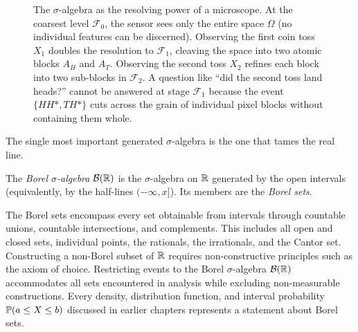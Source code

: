 \begin{figure}[H]
\caption{The $\sigma$-algebra as the resolving power of a microscope. At the coarsest level $\mathcal{F}_0$, the sensor sees only the entire space $\Omega$ (no individual features can be discerned). Observing the first coin toss $X_1$ doubles the resolution to $\mathcal{F}_1$, cleaving the space into two atomic blocks $A_H$ and $A_T$. Observing the second toss $X_2$ refines each block into two sub-blocks in $\mathcal{F}_2$. A question like ``did the second toss land heads?'' cannot be answered at stage $\mathcal{F}_1$ because the event $\{HH*, TH*\}$ cuts across the grain of individual pixel blocks without containing them whole.}
\label{ch36:fig-partition-tree}
\end{figure}

The single most important generated $\sigma$-algebra is the one that tames the
real line.

\begin{definition}
\label{ch36:borel}
The \emph{Borel $\sigma$-algebra} $\mathcal{B}(\R)$ is the $\sigma$-algebra on
$\R$ generated by the open intervals (equivalently, by the half-lines
$(-\infty, x]$). Its members are the \emph{Borel sets}.
\end{definition}

\begin{happeningbox}
The Borel sets encompass every set obtainable from intervals through countable
unions, countable intersections, and complements. This includes all open and closed
sets, individual points, the rationals, the irrationals, and the Cantor set.
Constructing a non-Borel subset of $\R$ requires non-constructive principles such
as the axiom of choice. Restricting events to the Borel $\sigma$-algebra $\mathcal{B}(\R)$
accommodates all sets encountered in analysis while excluding non-measurable constructions.
Every density, distribution function, and interval probability $\P(a \le X \le b)$
discussed in earlier chapters represents a statement about Borel sets.
\end{happeningbox}

